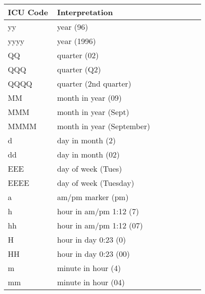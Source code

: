 \begin{table}[ht]
\centering
\begin{tabular}{|p{0.2\linewidth}| p{0.6\linewidth}|}
\hline
\centering
\textbf{ICU Code} & \textbf{Interpretation}\\ \hline

\scriptsize{yy} & \scriptsize{year (96)}\\ \hline
\scriptsize{yyyy} & \scriptsize{year (1996)}\\ \hline
    
\scriptsize{QQ} & \scriptsize{quarter (02)}\\ \hline
\scriptsize{QQQ} & \scriptsize{quarter (Q2)}\\ \hline
\scriptsize{QQQQ} & \scriptsize{quarter (2nd quarter)}\\ \hline
    
\scriptsize{MM} & \scriptsize{month in year (09)}\\ \hline
\scriptsize{MMM} & \scriptsize{month in year (Sept)}\\ \hline
\scriptsize{MMMM} & \scriptsize{month in year (September)}\\ \hline
    
\scriptsize{d} & \scriptsize{day in month (2)}\\ \hline
\scriptsize{dd} & \scriptsize{day in month (02)}\\ \hline
    
\scriptsize{EEE} & \scriptsize{day of week (Tues)}\\ \hline
\scriptsize{EEEE} & \scriptsize{day of week (Tuesday)}\\ \hline
    
\scriptsize{a} & \scriptsize{am/pm marker (pm)}\\ \hline
    
\scriptsize{h} & \scriptsize{hour in am/pm 1:12 (7)}\\ \hline
\scriptsize{hh} & \scriptsize{hour in am/pm 1:12 (07)}\\ \hline
    
\scriptsize{H} & \scriptsize{hour in day 0:23 (0)}\\ \hline
\scriptsize{HH} & \scriptsize{hour in day 0:23 (00)}\\ \hline
    
\scriptsize{m} & \scriptsize{minute in hour (4)}\\ \hline
\scriptsize{mm} & \scriptsize{minute in hour (04)}\\ \hline
    

\end{tabular}
\end{table}
